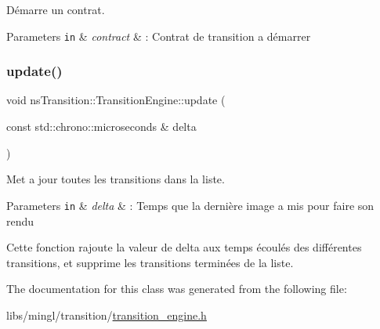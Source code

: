 Démarre un contrat. 


\begin{DoxyParams}[1]{Parameters}
\mbox{\tt in}  & {\em contract} & \+: Contrat de transition a démarrer \\
\hline
\end{DoxyParams}
\mbox{\label{classns_transition_1_1_transition_engine_a3bc437b23ee918b9ec4af070e205028f}} 
\subsubsection{\texorpdfstring{update()}{update()}}
{\footnotesize\ttfamily void ns\+Transition\+::\+Transition\+Engine\+::update (\begin{DoxyParamCaption}\item[{const std\+::chrono\+::microseconds \&}]{delta }\end{DoxyParamCaption})}



Met a jour toutes les transitions dans la liste. 


\begin{DoxyParams}[1]{Parameters}
\mbox{\tt in}  & {\em delta} & \+: Temps que la dernière image a mis pour faire son rendu\\
\hline
\end{DoxyParams}
Cette fonction rajoute la valeur de delta aux temps écoulés des différentes transitions, et supprime les transitions terminées de la liste. 

The documentation for this class was generated from the following file\+:\begin{DoxyCompactItemize}
\item 
libs/mingl/transition/\hyperlink{transition__engine_8h}{transition\+\_\+engine.\+h}\end{DoxyCompactItemize}
